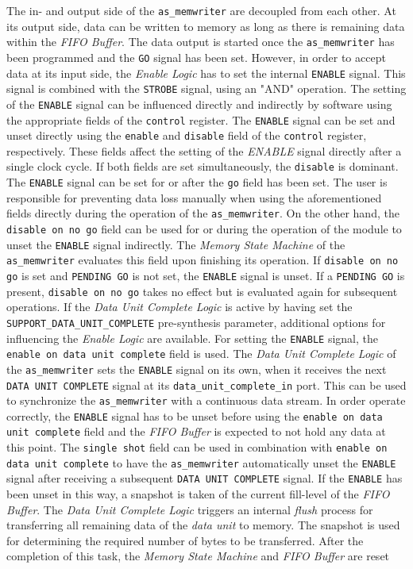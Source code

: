 The in- and output side of the \texttt{as\_memwriter} are decoupled from each other. 
At its output side, data can be written to memory as long as there is remaining data within the \textit{FIFO Buffer}.
The data output is started once the \texttt{as\_memwriter} has been programmed and the \texttt{GO} signal has been set.
However, in order to accept data at its input side, the \textit{Enable Logic} has to set the internal \texttt{ENABLE} signal.
This signal is combined with the \texttt{STROBE} signal, using an "AND" operation.
The setting of the \texttt{ENABLE} signal can be influenced directly and indirectly by software using the appropriate fields of the \texttt{control} register.
The \texttt{ENABLE} signal can be set and unset directly using the \texttt{enable} and \texttt{disable} field of the \texttt{control} register, respectively.
These fields affect the setting of the \textit{ENABLE} signal directly after a single clock cycle.
If both fields are set simultaneously, the \texttt{disable} is dominant.
The \texttt{ENABLE} signal can be set for or after the \texttt{go} field has been set.
The user is responsible for preventing data loss manually when using the aforementioned fields directly during the operation of the \texttt{as\_memwriter}.
On the other hand, the \texttt{disable on no go} field can be used for or during the operation of the module to unset the \texttt{ENABLE} signal indirectly.
The \textit{Memory State Machine} of the \texttt{as\_memwriter} evaluates this field upon finishing its operation.
If \texttt{disable on no go} is set and \texttt{PENDING GO} is not set, the \texttt{ENABLE} signal is unset.
If a \texttt{PENDING GO} is present, \texttt{disable on no go} takes no effect but is evaluated again for subsequent operations.
If the \textit{Data Unit Complete Logic} is active by having set the \texttt{SUPPORT\_DATA\_UNIT\_COMPLETE} pre-synthesis parameter, additional options for influencing the \textit{Enable Logic} are available.
For setting the \texttt{ENABLE} signal, the \texttt{enable on data unit complete} field is used.
The \textit{Data Unit Complete Logic} of the \texttt{as\_memwriter} sets the \texttt{ENABLE} signal on its own, when it receives the next \texttt{DATA UNIT COMPLETE} signal at its \texttt{data\_unit\_complete\_in} port.
This can be used to synchronize the \texttt{as\_memwriter} with a continuous data stream.
In order operate correctly, the \texttt{ENABLE} signal has to be unset before using the \texttt{enable on data unit complete} field and the \textit{FIFO Buffer} is expected to not hold any data at this point.
The \texttt{single shot} field can be used in combination with \texttt{enable on data unit complete} to have the \texttt{as\_memwriter} automatically unset the \texttt{ENABLE} signal after receiving a subsequent \texttt{DATA UNIT COMPLETE} signal.
If the \texttt{ENABLE} has been unset in this way, a snapshot is taken of the current fill-level of the \textit{FIFO Buffer}.
The \textit{Data Unit Complete Logic} triggers an internal \textit{flush} process for transferring all remaining data of the \textit{data unit} to memory.
The snapshot is used for determining the required number of bytes to be transferred.
After the completion of this task, the \textit{Memory State Machine} and \textit{FIFO Buffer} are reset



